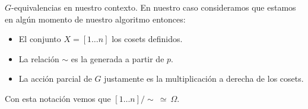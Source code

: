 \documentclass[aspectratio=169, 9pt]{beamer}
\newcommand{\In}{[1 \dots n]}
\begin{document}
\begin{frame}[fragile]{$G$-equivalencias en nuestro contexto.}
	En nuestro caso consideramos que estamos en algún momento de nuestro algoritmo entonces:
	\pause
	\begin{itemize}
		\item El conjunto $X = \In$ los cosets definidos.
		\pause
		\item La relación $\sim$ es la generada a partir de $p$.
		\pause
		\item La acción parcial de $G$ justamente es la multiplicación a derecha de los cosets.
	\end{itemize}

\pause

Con esta notación vemos que $\In /\sim \ \simeq \ \Omega$.
\end{frame}
\end{document}
